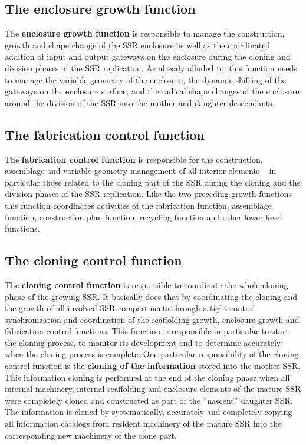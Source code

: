 \documentclass[letterpaper]{article}
\begin{document}
\bigskip

\subsection[The enclosure growth function]{The enclosure growth
function}
\hypertarget{RefHeading3096306210128}{}The \textbf{enclosure growth
function} is responsible to manage the construction, growth and shape
change of the SSR enclosure as well as the coordinated addition of
input and output gateways on the enclosure during the cloning and
division phases of the SSR replication. As already alluded to, this
function needs to manage the variable geometry of the enclosure, the
dynamic shifting of the gateways on the enclosure surface, and the
radical shape changes of the enclosure around the division of the SSR
into the mother and daughter descendants.


\bigskip

\subsection[The fabrication control function]{The fabrication control
function}
\hypertarget{RefHeading3098306210128}{}The \textbf{fabrication control
function} is responsible for the construction, assemblage and variable
geometry management of all interior elements – in particular those
related to the cloning part of the SSR during the cloning and the
division phases of the SSR replication.  Like the two preceding growth
functions this function coordinates activities of the fabrication
function, assemblage function, construction plan function, recycling
function and other lower level functions. 


\bigskip

\subsection[The cloning control function]{The cloning control function}
\hypertarget{RefHeading3100306210128}{}The \textbf{cloning control
function} is responsible to coordinate the whole cloning phase of the
growing SSR. It basically does that by coordinating the cloning and the
growth of all involved SSR compartments through a tight control,
synchronization and coordination of the scaffolding growth, enclosure
growth and fabrication control functions. This function is responsible
in particular to start the cloning process, to monitor its development
and to determine accurately when the cloning process is complete. One
particular responsibility of the cloning control function is the
\textbf{cloning of the information} stored into the mother SSR. This
information cloning is performed at the end of the cloning phase when
all internal machinery, internal scaffolding and enclosure elements of
the mature SSR were completely cloned and constructed as part of the
“nascent” daughter SSR. The information is cloned by systematically,
accurately and completely copying all information catalogs from
resident machinery of the mature SSR into the corresponding new
machinery of the clone part.
\end{document}
